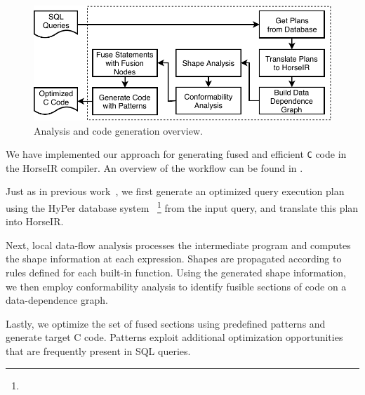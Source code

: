 \begin{figure}[htbp]
\centering
\includegraphics[width=.95\columnwidth]{./src/figure/overview-v4.pdf}
\caption{Analysis and code generation overview.} \label{fig:overview}
\end{figure}

We have implemented our approach for generating fused and efficient
\texttt{C} code in the HorseIR compiler. An overview of the workflow
can be found in .

Just as in previous work~\OldPaper, we first generate an optimized
query execution plan using the HyPer database system~\cite{Neumann2011:HyPer}
\footnote{}
from the input query, and translate this plan into HorseIR.

Next, local data-flow analysis processes the intermediate program and
computes the shape information at each expression. Shapes are propagated
according to rules defined for each built-in function. Using the
generated shape information, we then employ conformability analysis to
identify fusible sections of code on a data-dependence graph.

Lastly, we optimize the set of fused sections using predefined patterns
and generate target C code. Patterns exploit additional optimization
opportunities that are frequently present in SQL queries.
